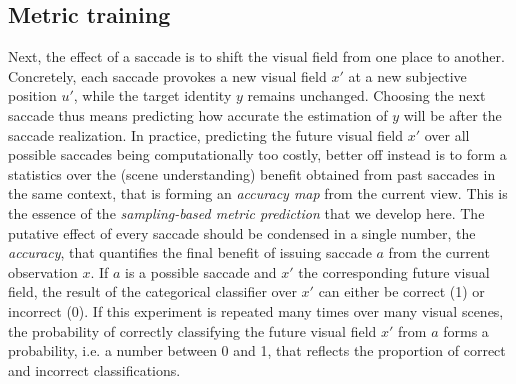 \subsection*{Metric training}
Next, the effect of a saccade is to shift the visual field from one place to another.
Concretely, each saccade provokes a new visual field $x'$ at a new subjective position $u'$, while the target identity $y$ remains unchanged.
Choosing the next saccade thus means predicting how accurate %
the estimation of $y$ will be after the saccade realization.
In practice, %
predicting the future visual field $x'$ over all possible saccades being computationally too costly, %
better off instead is to form a statistics over the (scene understanding) benefit obtained from past saccades in the same context, that is forming an \emph{accuracy map} from the current view. This is the essence of the \emph{sampling-based metric prediction} that we develop here. The putative effect of every saccade should be condensed in a single number, the \emph{accuracy}, that quantifies the final benefit of issuing saccade $a$ %
from the current observation $x$. If $a$ is a possible saccade and $x'$ the corresponding future visual field, the result of the categorical classifier over $x'$ can either be correct (1) or incorrect (0).
If this experiment is repeated many times over many visual scenes, the probability of correctly classifying the future visual field $x'$ from $a$ forms a probability, i.e. a number between 0 and 1, that reflects the proportion of correct and incorrect classifications.
